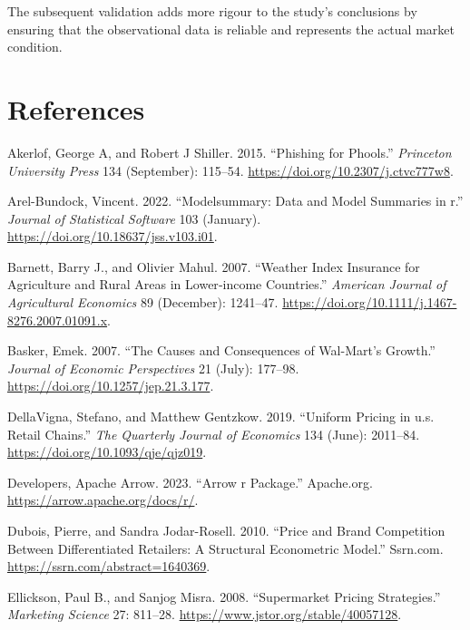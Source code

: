 \documentclass[
  letterpaper,
  DIV=11,
  numbers=noendperiod]{scrartcl}
\newlength{\cslhangindent}
\newenvironment{CSLReferences}[2] %
 {\begin{list}{}{%
  \setlength{\itemindent}{0pt}
  \setlength{\leftmargin}{0pt}
  \setlength{\parsep}{0pt}
  \ifodd #1
   \setlength{\leftmargin}{\cslhangindent}
   \setlength{\itemindent}{-1\cslhangindent}
  \fi
  \setlength{\itemsep}{#2\baselineskip}}}
 {\end{list}}
\begin{document}
The subsequent validation adds more rigour to the study's conclusions by
ensuring that the observational data is reliable and represents the
actual market condition.

\newpage

\section*{References}\label{references}

\label{refs}
\begin{CSLReferences}{1}{0}
Akerlof, George A, and Robert J Shiller. 2015. {``Phishing for
Phools.''} \emph{Princeton University Press} 134 (September): 115--54.
\url{https://doi.org/10.2307/j.ctvc777w8}.

Arel-Bundock, Vincent. 2022. {``Modelsummary: Data and Model Summaries
in r.''} \emph{Journal of Statistical Software} 103 (January).
\url{https://doi.org/10.18637/jss.v103.i01}.

Barnett, Barry J., and Olivier Mahul. 2007. {``Weather Index Insurance
for Agriculture and Rural Areas in Lower‐income Countries.''}
\emph{American Journal of Agricultural Economics} 89 (December):
1241--47. \url{https://doi.org/10.1111/j.1467-8276.2007.01091.x}.

Basker, Emek. 2007. {``The Causes and Consequences of Wal-Mart's
Growth.''} \emph{Journal of Economic Perspectives} 21 (July): 177--98.
\url{https://doi.org/10.1257/jep.21.3.177}.

DellaVigna, Stefano, and Matthew Gentzkow. 2019. {``Uniform Pricing in
u.s. Retail Chains.''} \emph{The Quarterly Journal of Economics} 134
(June): 2011--84. \url{https://doi.org/10.1093/qje/qjz019}.

Developers, Apache Arrow. 2023. {``Arrow r Package.''} Apache.org.
\url{https://arrow.apache.org/docs/r/}.

Dubois, Pierre, and Sandra Jodar-Rosell. 2010. {``Price and Brand
Competition Between Differentiated Retailers: A Structural Econometric
Model.''} Ssrn.com. \url{https://ssrn.com/abstract=1640369}.

Ellickson, Paul B., and Sanjog Misra. 2008. {``Supermarket Pricing
Strategies.''} \emph{Marketing Science} 27: 811--28.
\url{https://www.jstor.org/stable/40057128}.


\end{CSLReferences}
\end{document}
